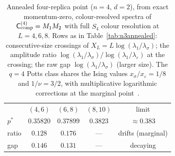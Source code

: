 \documentclass[aps,prx,reprint,superscriptaddress,nobibnotes,longbibliography]{revtex4-2}
\theoremstyle{remark}
\newcommand{\Ccomp}{\mathsf C_{\rm comp}}
\begin{document}
\begin{table}[t]
\caption{Annealed four-replica point ($n=4$, $d=2$), from exact momentum-zero, colour-resolved spectra of $\Ccomp^{(4)}=M_1M_2$ with full $S_4$ colour resolution at $L=4,6,8$.  Rows as in Table~\ref{tab:n3annealed}: consecutive-size crossings of $X_L=L\log(\lambda_1/\lambda_\sigma)$; the amplitude ratio $\log(\lambda_1/\lambda_\sigma)/\log(\lambda_1/\lambda_\varepsilon)$ at the crossing; the raw gap $\log(\lambda_1/\lambda_\sigma)$ (larger size).  The $q=4$ Potts class shares the Ising values $x_\sigma/x_\varepsilon=1/8$ and $1/\nu=3/2$, with multiplicative logarithmic corrections at the marginal point~\cite{Cardy1986}.}
\label{tab:n4annealed}
\begin{ruledtabular}
\begin{tabular}{lcccc}
 & $(4,6)$ & $(6,8)$ & $(8,10)$ & limit \\
\colrule
$p^*$ & $0.35820$ & $0.37899$ & $0.3823$ & $\approx0.383$ \\
ratio & $0.128$ & $0.176$ & --- & drifts (marginal) \\
gap & $0.146$ & $0.131$ & --- & decaying \\
\end{tabular}
\end{ruledtabular}
\end{table}
\end{document}
